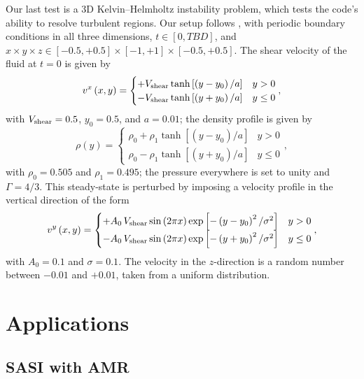Our last test is a 3D Kelvin--Helmholtz instability problem,
which tests the code's ability to resolve turbulent regions.
Our setup follows \cite{rr2012}, with
periodic boundary conditions in all three dimensions,
$t\in\left[0,TBD\right]$, and
$x\times y\times z\in\left[-0.5,+0.5\right]
\times\left[-1,+1\right]\times\left[-0.5,+0.5\right]$.
The shear velocity of the fluid at $t=0$ is given by
\begin{equation}
  v^{x}\left(x,y\right)
  =\begin{cases}
     +V_{\mathrm{shear}}\tanh\left[\left(y-y_{0}\right)/a\right] & y>0 \\
     -V_{\mathrm{shear}}\tanh\left[\left(y+y_{0}\right)/a\right] & y\leq0
   \end{cases},
\end{equation}
with $V_{\mathrm{shear}}=0.5$, $y_{0}=0.5$, and $a=0.01$;
the density profile is given by
\begin{equation}
  \rho\left(y\right)
  =\begin{cases}
     \rho_{0}+\rho_{1}\tanh\left[\left(y-y_{0}\right)/a\right] & y>0 \\
     \rho_{0}-\rho_{1}\tanh\left[\left(y+y_{0}\right)/a\right] & y\leq0
   \end{cases},
\end{equation}
with $\rho_{0}=0.505$ and $\rho_{1}=0.495$;
the pressure everywhere is set to unity and $\Gamma=4/3$.
This steady-state is perturbed by imposing a velocity profile in the vertical
direction of the form
\begin{equation}
  v^{y}\left(x,y\right)
  =\begin{cases}
     +A_{0}\,V_{\mathrm{shear}}\sin\left(2\pi x\right)
     \exp\left[-\left(y-y_{0}\right)^{2}/\sigma^{2}\right] & y>0 \\
     -A_{0}\,V_{\mathrm{shear}}\sin\left(2\pi x\right)
     \exp\left[-\left(y+y_{0}\right)^{2}/\sigma^{2}\right] & y\leq0
   \end{cases},
\end{equation}
with $A_{0}=0.1$ and $\sigma=0.1$.
The velocity in the $z$-direction is a random number between
$-0.01$ and $+0.01$, taken from a uniform distribution.

\section{Applications}

\subsection{SASI with AMR}

